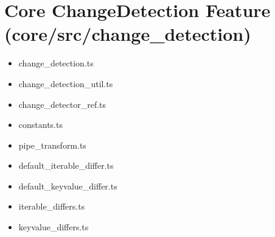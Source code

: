 \section{Core ChangeDetection Feature (core/src/change\_detection)}


\begin{itemize}
  \item change\_detection.ts
  \item change\_detection\_util.ts
  \item change\_detector\_ref.ts
  \item constants.ts
  \item pipe\_transform.ts
\end{itemize}

















\begin{itemize}
  \item default\_iterable\_differ.ts
  \item default\_keyvalue\_differ.ts
  \item iterable\_differs.ts
  \item keyvalue\_differs.ts
\end{itemize}
